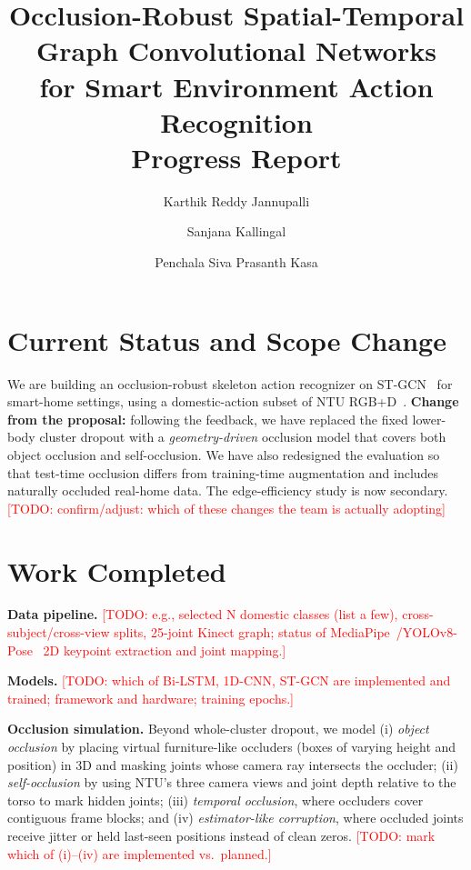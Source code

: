 \documentclass[11pt,twocolumn,letterpaper]{article}
\title{Occlusion-Robust Spatial-Temporal Graph Convolutional Networks\\for Smart Environment Action Recognition\\{\large Progress Report}}
\author{Karthik Reddy Jannupalli \and Sanjana Kallingal \and Penchala Siva Prasanth Kasa}
\newcommand{\todo}[1]{\textcolor{red}{[TODO: #1]}}
\begin{document}
\maketitle

\section{Current Status and Scope Change}
We are building an occlusion-robust skeleton action recognizer on ST-GCN~\cite{yan2018stgcn}
for smart-home settings, using a domestic-action subset of NTU RGB+D~\cite{shahroudy2016ntu}.
\textbf{Change from the proposal:} following the feedback, we have replaced the fixed
lower-body cluster dropout with a \emph{geometry-driven} occlusion model that covers both
object occlusion and self-occlusion. We have also redesigned the evaluation so that
test-time occlusion differs from training-time augmentation and includes naturally
occluded real-home data. The edge-efficiency study is now secondary.
\todo{confirm/adjust: which of these changes the team is actually adopting}

\section{Work Completed}
\textbf{Data pipeline.} \todo{e.g., selected N domestic classes (list a few), cross-subject/cross-view splits, 25-joint Kinect graph; status of MediaPipe~\cite{lugaresi2019mediapipe}/YOLOv8-Pose~\cite{jocher2023yolov8} 2D keypoint extraction and joint mapping.}

\textbf{Models.} \todo{which of Bi-LSTM, 1D-CNN, ST-GCN are implemented and trained; framework and hardware; training epochs.}

\textbf{Occlusion simulation.} Beyond whole-cluster dropout, we model
(i) \emph{object occlusion} by placing virtual furniture-like occluders (boxes of varying
height and position) in 3D and masking joints whose camera ray intersects the occluder;
(ii) \emph{self-occlusion} by using NTU's three camera views and joint depth relative to
the torso to mark hidden joints; (iii) \emph{temporal occlusion}, where occluders cover
contiguous frame blocks; and (iv) \emph{estimator-like corruption}, where occluded joints
receive jitter or held last-seen positions instead of clean zeros.
\todo{mark which of (i)--(iv) are implemented vs.\ planned.}
\end{document}
